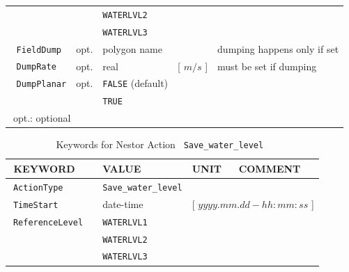 \begin{table}[ht]
\begin{tabular}{| l | l | l | l | p{2.6cm} |}
{\textcolor{white}{\LARGE |}}                         &     &\texttt{WATERLVL2}     &                       &                     \\
{\textcolor{white}{\LARGE |}}                         &     &\texttt{WATERLVL3}     &                       &                     \\ \hline
{\textcolor{white}{\LARGE |}} \texttt{FieldDump}      &opt. &polygon name           &                       &dumping happens only if set \\ \hline
{\textcolor{white}{\LARGE |}} \texttt{DumpRate}       &opt. &real                   &[ $m/s$ ]              &must be set if dumping\\ \hline
{\textcolor{white}{\LARGE |}} \texttt{DumpPlanar}     &opt. &\texttt{FALSE} (\small{default}) &             &                     \\
{\textcolor{white}{\LARGE |}}                         &     &\texttt{TRUE}                    &             &                     \\ \hline
\multicolumn{5}{|l|}{{\textcolor{white}{\LARGE |}}\small{opt.: optional}}                                                        \\ \hline
\end{tabular}
\end{table}


\newpage
\begin{table}[ht]
\centering
\caption{Keywords for Nestor Action \texttt{~Save\_water\_level~}}
\begin{tabular}{| l | l | l | l | p{4.4cm} |}
\hline
{\textcolor{white}{\LARGE |}}\textbf{KEYWORD}        &     &\textbf{VALUE}         &\textbf{UNIT}          &\textbf{COMMENT}     \\ \hline
{\textcolor{white}{\LARGE |}}\texttt{ActionType}     &     &\texttt{Save\_water\_level}&                   &                     \\ \hline
{\textcolor{white}{\LARGE |}}\texttt{TimeStart}      &     &date-time              &\multicolumn{2}{l|}{[ $yyyy.mm.dd-hh:mm:ss$ ]} \\ \hline
{\textcolor{white}{\LARGE |}}\texttt{ReferenceLevel} &     &\texttt{WATERLVL1}     &                       &                     \\
{\textcolor{white}{\LARGE |}}                        &     &\texttt{WATERLVL2}     &                       &                     \\
{\textcolor{white}{\LARGE |}}                        &     &\texttt{WATERLVL3}     &                       &                     \\ \hline
\end{tabular}
\end{table}


